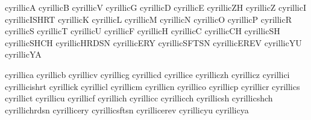  cyrillicA     {}
 cyrillicB     {}
 cyrillicV     {}
 cyrillicG     {}
 cyrillicD     {}
 cyrillicE     {}
 cyrillicZH    {}
 cyrillicZ     {}
 cyrillicI     {}
 cyrillicISHRT {}
 cyrillicK     {}
 cyrillicL     {}
 cyrillicM     {}
 cyrillicN     {}
 cyrillicO     {}
 cyrillicP     {}
 cyrillicR     {}
 cyrillicS     {}
 cyrillicT     {}
 cyrillicU     {}
 cyrillicF     {}
 cyrillicH     {}
 cyrillicC     {}
 cyrillicCH    {}
 cyrillicSH    {}
 cyrillicSHCH  {}
 cyrillicHRDSN {}
 cyrillicERY   {}
 cyrillicSFTSN {}
 cyrillicEREV  {}
 cyrillicYU    {}
 cyrillicYA    {}

 cyrillica     {}
 cyrillicb     {}
 cyrillicv     {}
 cyrillicg     {}
 cyrillicd     {}
 cyrillice     {}
 cyrilliczh    {}
 cyrillicz     {}
 cyrillici     {}
 cyrillicishrt {}
 cyrillick     {}
 cyrillicl     {}
 cyrillicm     {}
 cyrillicn     {}
 cyrillico     {}
 cyrillicp     {}
 cyrillicr     {}
 cyrillics     {}
 cyrillict     {}
 cyrillicu     {}
 cyrillicf     {}
 cyrillich     {}
 cyrillicc     {}
 cyrillicch    {}
 cyrillicsh    {}
 cyrillicshch  {}
 cyrillichrdsn {}
 cyrillicery   {}
 cyrillicsftsn {}
 cyrillicerev  {}
 cyrillicyu    {}
 cyrillicya    {}

